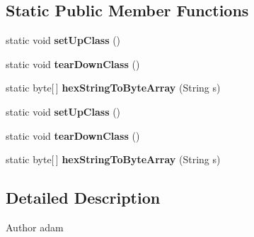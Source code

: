 \subsection*{Static Public Member Functions}
\begin{DoxyCompactItemize}
\item 
\hypertarget{class_c_a_s_u_a_l_1_1crypto_1_1_a_e_s128_handler_test_a5c3c11d19d50fcf9a6590a3bf622e73b}{static void {\bfseries set\-Up\-Class} ()}\label{class_c_a_s_u_a_l_1_1crypto_1_1_a_e_s128_handler_test_a5c3c11d19d50fcf9a6590a3bf622e73b}

\item 
\hypertarget{class_c_a_s_u_a_l_1_1crypto_1_1_a_e_s128_handler_test_a554b66812ee28a736de359728da0fae7}{static void {\bfseries tear\-Down\-Class} ()}\label{class_c_a_s_u_a_l_1_1crypto_1_1_a_e_s128_handler_test_a554b66812ee28a736de359728da0fae7}

\item 
\hypertarget{class_c_a_s_u_a_l_1_1crypto_1_1_a_e_s128_handler_test_a0593194f0ac99447711128bc9cb5e71a}{static byte\mbox{[}$\,$\mbox{]} {\bfseries hex\-String\-To\-Byte\-Array} (String s)}\label{class_c_a_s_u_a_l_1_1crypto_1_1_a_e_s128_handler_test_a0593194f0ac99447711128bc9cb5e71a}

\item 
\hypertarget{class_c_a_s_u_a_l_1_1crypto_1_1_a_e_s128_handler_test_a5c3c11d19d50fcf9a6590a3bf622e73b}{static void {\bfseries set\-Up\-Class} ()}\label{class_c_a_s_u_a_l_1_1crypto_1_1_a_e_s128_handler_test_a5c3c11d19d50fcf9a6590a3bf622e73b}

\item 
\hypertarget{class_c_a_s_u_a_l_1_1crypto_1_1_a_e_s128_handler_test_a554b66812ee28a736de359728da0fae7}{static void {\bfseries tear\-Down\-Class} ()}\label{class_c_a_s_u_a_l_1_1crypto_1_1_a_e_s128_handler_test_a554b66812ee28a736de359728da0fae7}

\item 
\hypertarget{class_c_a_s_u_a_l_1_1crypto_1_1_a_e_s128_handler_test_a0593194f0ac99447711128bc9cb5e71a}{static byte\mbox{[}$\,$\mbox{]} {\bfseries hex\-String\-To\-Byte\-Array} (String s)}\label{class_c_a_s_u_a_l_1_1crypto_1_1_a_e_s128_handler_test_a0593194f0ac99447711128bc9cb5e71a}

\end{DoxyCompactItemize}


\subsection{Detailed Description}
\begin{DoxyAuthor}{Author}
adam 
\end{DoxyAuthor}


